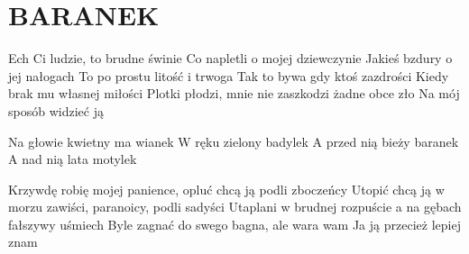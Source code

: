 \documentclass[../../../songbook.tex]{subfiles}
\begin{document}
\TabPositions{8cm} %
\section*{BARANEK}
\vspace{0.5cm}

Ech Ci ludzie, to brudne świnie			 \newline
Co napletli o mojej dziewczynie			 \newline
Jakieś bzdury o jej nałogach			 \newline
To po prostu litość i trwoga			 \newline
Tak to bywa gdy ktoś zazdrości			 \newline
Kiedy brak mu własnej miłości			 \newline
Plotki płodzi, mnie nie zaszkodzi żadne obce zło	 \newline
Na mój sposób widzieć ją			 \newline

\-\hspace{1cm} Na głowie kwietny ma wianek	 \newline
\-\hspace{1cm} W ręku zielony badylek		 \newline
\-\hspace{1cm} A przed nią bieży baranek	 \newline
\-\hspace{1cm} A nad nią lata motylek		 \newline

Krzywdę robię mojej panience, opluć chcą ją podli zboczeńcy			\newline
Utopić chcą ją w morzu zawiści, paranoicy, podli sadyści			\newline
Utaplani w brudnej rozpuście a na gębach fałszywy uśmiech			\newline
Byle zagnać do swego bagna, ale wara wam							\newline
Ja ją przecież lepiej znam											\newline
\end{document}
